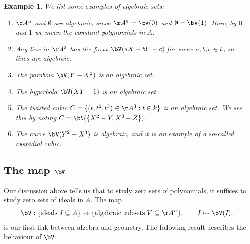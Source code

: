 \documentclass[12pt]{amsart}
\theoremstyle{plain}
\newtheorem{example}[theorem]{Example}
\begin{document}
\begin{example}\label{algsetex}
We list some examples of algebraic sets:
\begin{enumerate}
\item
$\AA^n$ and $\emptyset$ are algebraic, since $\AA^n = \bV(0)$ and $\emptyset = \bV(1)$.
Here, by $0$ and $1$ we mean the constant polynomials in $A$.

\item
Any line in $\AA^2$ has the form $\bV(aX+bY-c)$ for some $a, b, c \in k$, so lines are algebraic.

\item
The parabola $\bV(Y-X^2)$ is an algebraic set.

\item
The hyperbola $\bV(XY - 1)$ is an algebraic set.

\item
The twisted cubic $C = \{(t, t^2, t^3) \in \AA^3 : t \in k\}$ is an algebraic set.
We see this by noting $C = \bV(\{X^2 - Y, X^3 - Z\}).$

\item 
The curve $\bV(Y^2 - X^3)$ is algebraic, and it is an example of a so-called cuspidial cubic.
\end{enumerate}
\end{example}





\subsection{The map $\bV$}
Our discussion above tells us that to study zero sets of polynomials, it suffices to study zero sets of ideals in $A$.
The map
$$\bV : \{\text{ideals } I \subseteq A\} \to \{\text{algebraic subsets } V \subseteq \AA^n\}, \qquad I \mapsto \bV(I),$$
is our first link between algebra and geometry.
The following result describes the behaviour of $\bV$:
\end{document}
